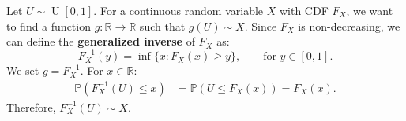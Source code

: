 \documentclass{huhtakm-template-book-v2}
\newcommand{\prob}{\mathbb{P}}
\DeclareMathOperator{\U}{U}
\begin{document}
    \begin{eg} 
        Let $U \sim \U[0,1]$. For a continuous random variable $X$ with CDF $F_{X}$, we want to find a function $g:\mathbb{R} \to \mathbb{R}$ such that $g(U) \sim X$. Since $F_{X}$ is non-decreasing, we can define the \textbf{generalized inverse} of $F_{X}$ as:
        \begin{equation*}
            F_{X}^{-1}(y) = \inf\{x:F_{X}(x) \geq y\}, \qquad\text{for }y \in [0,1].
        \end{equation*}
        We set $g = F_{X}^{-1}$. For $x \in \mathbb{R}$:
        \begin{align*}
            \prob(F_{X}^{-1}(U) \leq x) &= \prob(U \leq F_{X}(x)) = F_{X}(x).
        \end{align*}
        Therefore, $F_{X}^{-1}(U) \sim X$.
        \end{eg}
    \newpage
\end{document}

